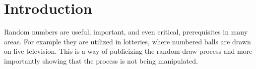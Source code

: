 \section{Introduction}\label{cha:introduction}

Random numbers are useful, important, and even critical, prerequisites in many areas.
%
For example they are utilized in lotteries, where numbered balls are drawn on live television. This is a way of publicizing the random draw process and more importantly showing that the process is not being manipulated.




